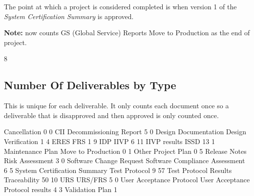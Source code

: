 \documentclass{article}
\begin{document}
The point at which a project is considered completed is when version 1 of the
\textit{System Certification Summary} is approved.

\textbf{Note:} now counts GS (Global Service) Reports Move to Production as the end
of project.

\begin{Schunk}
\begin{Soutput}
[1] 8
\end{Soutput}
\end{Schunk}


\subsection{Number Of Deliverables by Type}
This is unique for each deliverable. It only counts each document once so a deliverable
that is disapproved and then approved is only counted once.

\begin{Schunk}
\begin{Soutput}
                                                     Cancellation 
                               0                                0 
                             CII           Decommissioning Report 
                               5                                0 
            Design Documentation              Design Verification 
                               1                                4 
                            ERES                              FRS 
                               1                                9 
                             IDP                             IIVP 
                               6                               11 
                    IIVP results                             ISSD 
                              13                                1 
                Maintenance Plan               Move to Production 
                               0                                1 
                           Other                     Project Plan 
                               0                                5 
                   Release Notes                  Risk Assessment 
                               3                                0 
         Software Change Request   Software Compliance Assessment 
                               6                                5 
    System Certification Summary                    Test Protocol 
                               9                               57 
           Test Protocol Results                     Traceability 
                              50                               10 
                             URS                          URS/FRS 
                               5                                0 
        User Acceptance Protocol User Acceptance Protocol results 
                               4                                3 
                 Validation Plan 
                               1 
\end{Soutput}
\end{Schunk}
\end{document}
